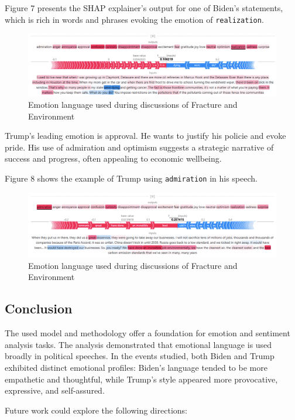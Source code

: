 \documentclass[pdflatex,sn-mathphys-num]{sn-jnl}%
\begin{document}
Figure 7 presents the SHAP explainer’s output for one of Biden’s statements, which is rich in words and phrases evoking the emotion of \texttt{realization}.

\begin{figure}[H]
	\centering
	\includegraphics[width=12cm]{f7-explainer_realization.png}
	\caption{Emotion language used during discussions of Fracture and Environment}
\end{figure}

Trump's leading emotion is approval. He wants to justify his policie and evoke pride. His use of admiration and optimism suggests a strategic narrative of success and progress, often appealing to economic wellbeing.

Figure 8 shows the example of Trump using \texttt{admiration} in his speech.

\begin{figure}[H]
	\centering
	\includegraphics[width=12cm]{f8-explainer_admiration.png}
	\caption{Emotion language used during discussions of Fracture and Environment}
\end{figure}

\subsection{Conclusion}

The used model and methodology offer a foundation for emotion and sentiment analysis tasks.
The analysis demonstrated that emotional language is used broadly in political speeches. In the events studied, both Biden and Trump exhibited distinct emotional profiles: Biden’s language tended to be more empathetic and thoughtful, while Trump’s style appeared more provocative, expressive, and self-assured.

Future work could explore the following directions:
\end{document}
